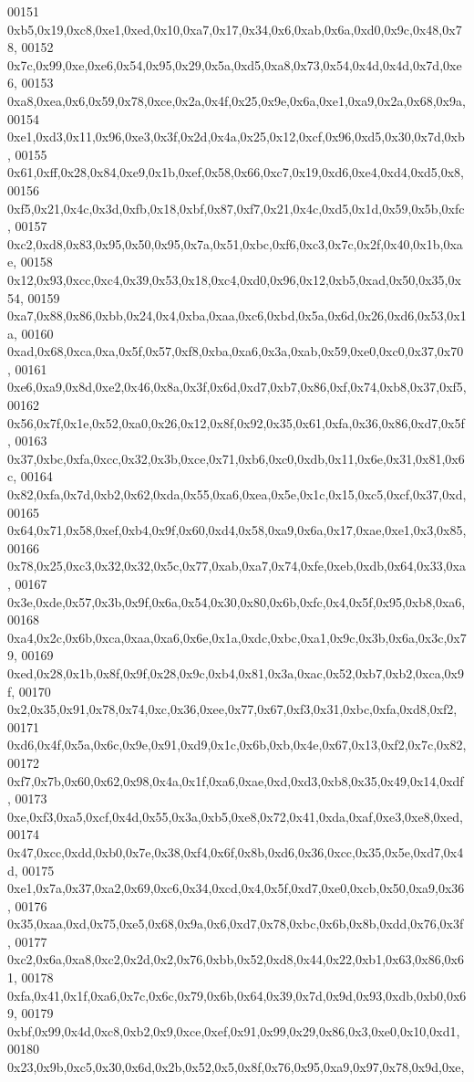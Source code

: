 \begin{DoxyCode}
00151   0xb5,0x19,0xc8,0xe1,0xed,0x10,0xa7,0x17,0x34,0x6,0xab,0x6a,0xd0,0x9c,0x48,0x78,
00152   0x7c,0x99,0xe,0xe6,0x54,0x95,0x29,0x5a,0xd5,0xa8,0x73,0x54,0x4d,0x4d,0x7d,0xe6,
00153   0xa8,0xea,0x6,0x59,0x78,0xce,0x2a,0x4f,0x25,0x9e,0x6a,0xe1,0xa9,0x2a,0x68,0x9a,
00154   0xe1,0xd3,0x11,0x96,0xe3,0x3f,0x2d,0x4a,0x25,0x12,0xcf,0x96,0xd5,0x30,0x7d,0xb,
00155   0x61,0xff,0x28,0x84,0xe9,0x1b,0xef,0x58,0x66,0xc7,0x19,0xd6,0xe4,0xd4,0xd5,0x8,
00156   0xf5,0x21,0x4c,0x3d,0xfb,0x18,0xbf,0x87,0xf7,0x21,0x4c,0xd5,0x1d,0x59,0x5b,0xfc,
00157   0xc2,0xd8,0x83,0x95,0x50,0x95,0x7a,0x51,0xbc,0xf6,0xc3,0x7c,0x2f,0x40,0x1b,0xae,
00158   0x12,0x93,0xcc,0xc4,0x39,0x53,0x18,0xc4,0xd0,0x96,0x12,0xb5,0xad,0x50,0x35,0x54,
00159   0xa7,0x88,0x86,0xbb,0x24,0x4,0xba,0xaa,0xc6,0xbd,0x5a,0x6d,0x26,0xd6,0x53,0x1a,
00160   0xad,0x68,0xca,0xa,0x5f,0x57,0xf8,0xba,0xa6,0x3a,0xab,0x59,0xe0,0xc0,0x37,0x70,
00161   0xe6,0xa9,0x8d,0xe2,0x46,0x8a,0x3f,0x6d,0xd7,0xb7,0x86,0xf,0x74,0xb8,0x37,0xf5,
00162   0x56,0x7f,0x1e,0x52,0xa0,0x26,0x12,0x8f,0x92,0x35,0x61,0xfa,0x36,0x86,0xd7,0x5f,
00163   0x37,0xbc,0xfa,0xcc,0x32,0x3b,0xce,0x71,0xb6,0xc0,0xdb,0x11,0x6e,0x31,0x81,0x6c,
00164   0x82,0xfa,0x7d,0xb2,0x62,0xda,0x55,0xa6,0xea,0x5e,0x1c,0x15,0xc5,0xcf,0x37,0xd,
00165   0x64,0x71,0x58,0xef,0xb4,0x9f,0x60,0xd4,0x58,0xa9,0x6a,0x17,0xae,0xe1,0x3,0x85,
00166   0x78,0x25,0xc3,0x32,0x32,0x5c,0x77,0xab,0xa7,0x74,0xfe,0xeb,0xdb,0x64,0x33,0xa,
00167   0x3e,0xde,0x57,0x3b,0x9f,0x6a,0x54,0x30,0x80,0x6b,0xfc,0x4,0x5f,0x95,0xb8,0xa6,
00168   0xa4,0x2c,0x6b,0xca,0xaa,0xa6,0x6e,0x1a,0xdc,0xbc,0xa1,0x9c,0x3b,0x6a,0x3c,0x79,
00169   0xed,0x28,0x1b,0x8f,0x9f,0x28,0x9c,0xb4,0x81,0x3a,0xac,0x52,0xb7,0xb2,0xca,0x9f,
00170   0x2,0x35,0x91,0x78,0x74,0xc,0x36,0xee,0x77,0x67,0xf3,0x31,0xbc,0xfa,0xd8,0xf2,
00171   0xd6,0x4f,0x5a,0x6c,0x9e,0x91,0xd9,0x1c,0x6b,0xb,0x4e,0x67,0x13,0xf2,0x7c,0x82,
00172   0xf7,0x7b,0x60,0x62,0x98,0x4a,0x1f,0xa6,0xae,0xd,0xd3,0xb8,0x35,0x49,0x14,0xdf,
00173   0xe,0xf3,0xa5,0xcf,0x4d,0x55,0x3a,0xb5,0xe8,0x72,0x41,0xda,0xaf,0xe3,0xe8,0xed,
00174   0x47,0xcc,0xdd,0xb0,0x7e,0x38,0xf4,0x6f,0x8b,0xd6,0x36,0xcc,0x35,0x5e,0xd7,0x4d,
00175   0xe1,0x7a,0x37,0xa2,0x69,0xc6,0x34,0xcd,0x4,0x5f,0xd7,0xe0,0xcb,0x50,0xa9,0x36,
00176   0x35,0xaa,0xd,0x75,0xe5,0x68,0x9a,0x6,0xd7,0x78,0xbc,0x6b,0x8b,0xdd,0x76,0x3f,
00177   0xc2,0x6a,0xa8,0xc2,0x2d,0x2,0x76,0xbb,0x52,0xd8,0x44,0x22,0xb1,0x63,0x86,0x61,
00178   0xfa,0x41,0x1f,0xa6,0x7c,0x6c,0x79,0x6b,0x64,0x39,0x7d,0x9d,0x93,0xdb,0xb0,0x69,
00179   0xbf,0x99,0x4d,0xc8,0xb2,0x9,0xce,0xef,0x91,0x99,0x29,0x86,0x3,0xe0,0x10,0xd1,
00180   0x23,0x9b,0xc5,0x30,0x6d,0x2b,0x52,0x5,0x8f,0x76,0x95,0xa9,0x97,0x78,0x9d,0xe,

\end{DoxyCode}
